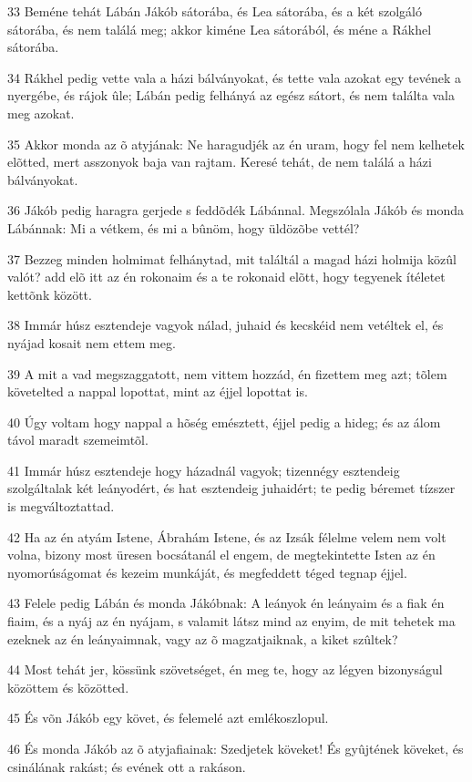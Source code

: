 \par 33 Beméne tehát Lábán Jákób sátorába, és Lea sátorába, és a két szolgáló sátorába, és nem találá meg; akkor kiméne Lea sátorából, és méne a Rákhel sátorába.
\par 34 Rákhel pedig vette vala a házi bálványokat, és tette vala azokat egy tevének a nyergébe, és rájok ûle; Lábán pedig felhányá az egész sátort, és nem találta vala meg azokat.
\par 35 Akkor monda az õ atyjának: Ne haragudjék az én uram, hogy fel nem kelhetek elõtted, mert asszonyok baja van rajtam. Keresé tehát, de nem találá a házi bálványokat.
\par 36 Jákób pedig haragra gerjede s feddõdék Lábánnal. Megszólala Jákób és monda Lábánnak: Mi a vétkem, és mi a bûnöm, hogy üldözõbe vettél?
\par 37 Bezzeg minden holmimat felhánytad, mit találtál a magad házi holmija közûl valót? add elõ itt az én rokonaim és a te rokonaid elõtt, hogy tegyenek ítéletet kettõnk között.
\par 38 Immár húsz esztendeje vagyok nálad, juhaid és kecskéid nem vetéltek el, és nyájad kosait nem ettem meg.
\par 39 A mit a vad megszaggatott, nem vittem hozzád, én fizettem meg azt; tõlem követelted a nappal lopottat, mint az éjjel lopottat is.
\par 40 Úgy voltam hogy nappal a hõség emésztett, éjjel pedig a hideg; és az álom távol maradt szemeimtõl.
\par 41 Immár húsz esztendeje hogy házadnál vagyok; tizennégy esztendeig szolgáltalak két leányodért, és hat esztendeig juhaidért; te pedig béremet tízszer is megváltoztattad.
\par 42 Ha az én atyám Istene, Ábrahám Istene, és az Izsák félelme velem nem volt volna, bizony most üresen bocsátanál el engem, de megtekintette Isten az én nyomorúságomat és kezeim munkáját, és megfeddett téged tegnap éjjel.
\par 43 Felele pedig Lábán és monda Jákóbnak: A leányok én leányaim és a fiak én fiaim, és a nyáj az én nyájam, s valamit látsz mind az enyim, de mit tehetek ma ezeknek az én leányaimnak, vagy az õ magzatjaiknak, a kiket szûltek?
\par 44 Most tehát jer, kössünk szövetséget, én meg te, hogy az légyen bizonyságul közöttem és közötted.
\par 45 És võn Jákób egy követ, és felemelé azt emlékoszlopul.
\par 46 És monda Jákób az õ atyjafiainak: Szedjetek köveket! És gyûjtének köveket, és csinálának rakást; és evének ott a rakáson.
